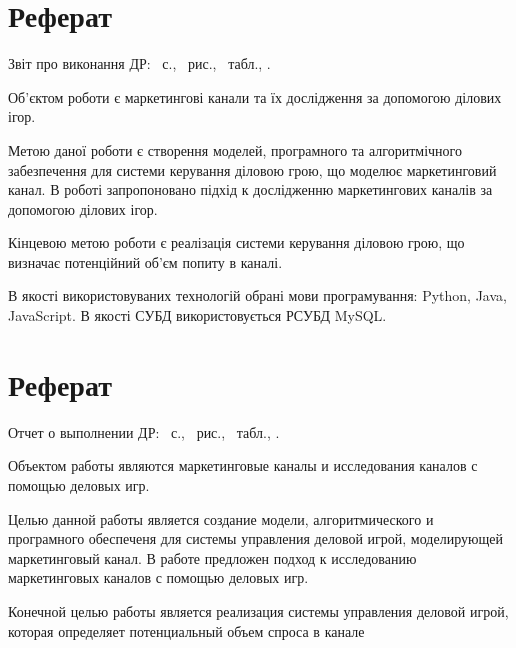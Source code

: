 \section*{Реферат}
\skipline
Звіт про виконання ДР:
~с., ~рис., ~табл.,
.\skipline

\skipline

Об'єктом роботи є маркетингові канали та їх дослідження за допомогою ділових ігор.

Метою даної роботи є створення моделей, програмного та алгоритмічного забезпечення для системи керування діловою грою, що моделює маркетинговий канал. В роботі запропоновано підхід к дослідженню маркетингових каналів за допомогою ділових ігор.

Кінцевою метою роботи є реалізація системи керування діловою грою, що визначає потенційний об’єм попиту в каналі.

В якості використовуваних технологій обрані мови програмування: Python, Java, JavaScript. В якості СУБД використовується РСУБД MySQL.

\section*{Реферат}
\skipline
Отчет о выполнении ДР:
~с., ~рис., ~табл.,
.\skipline

\skipline

Объектом работы являются маркетинговые каналы и исследования каналов с помощью деловых игр.

Целью данной работы является создание модели, алгоритмического и програмного обеспеченя для системы управления деловой игрой, моделирующей маркетинговый канал. В работе предложен
подход к исследованию маркетинговых каналов с помощью деловых игр.

Конечной целью работы является реализация системы управления деловой игрой, которая определяет потенциальный объем спроса в канале

